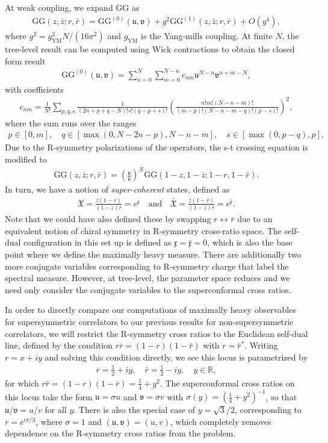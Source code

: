 \documentclass[a4paper,11pt]{article}
\theoremstyle{plain}
\theoremstyle{definition}
\theoremstyle{remark}
\newcommand{\ba}{\begin{equation} \begin{aligned}}
\newcommand{\ea}{\end{aligned} \end{equation}}
\begin{document}
At weak coupling, we expand $\mathrm{GG}$ as
\ba
\mathrm{GG}(z,\bar{z};r,\bar{r}) = \mathrm{GG}^{(0)}(\mathfrak{u},\mathfrak{v}) + g^2 \mathrm{GG}^{(1)}(z,\bar{z};r,\bar{r})  + O(g^4),
\ea
where $g^2 = g_{\mathrm{YM}}^2 N /(16 \pi^2)$ and $g_{\mathrm{YM}}$ is the Yang-mills coupling. At finite $N$, the tree-level result can be computed using Wick contractions to obtain the closed form result~\cite{Vescovi:2021fjf}
\ba
\mathrm{GG}^{(0)}(\mathfrak{u},\mathfrak{v}) = \sum_{n=0}^N \sum_{m=0}^{N-n} c_{nm} \mathfrak{u}^{N-n}\mathfrak{v}^{n+m-N},
\ea
with coefficients
\ba
c_{nm}  = \frac{1}{N!} \sum_{p,q,s} \frac{1}{(2n + p + q - N)!  s!  (q - p + s)!} \left(
\frac{n!  m!  (N - n - m)!}{(m - p)!  (N - n - m - q)!  (p - s)!} \right)^2,
\ea
where the sum runs over the ranges
\ba
p \in [0, m], \quad 
q \in [\max(0, N - 2n - p),  N - n - m], \quad 
s \in [\max(0, p - q),  p].
\ea
Due to the R-symmetry polarizations of the operators, the s-t crossing equation is modified to
\ba
\mathrm{GG}(z, \bar{z};r,\bar{r}) = \left( \frac{\mathfrak{u}}{\mathfrak{v}}\right)^N \mathrm{GG}(1-z,1- \bar{z};1-r,1-\bar{r}).
\ea
In turn, we have a notion of \textit{super-coherent} states, defined as 
\ba
\mathfrak{X} = \frac{z (1-r)}{(1-z)r} = e^{\mathfrak{x}} \quad\text{and}\quad \bar{\mathfrak{X}} = \frac{\bar{z} (1-\bar{r})}{(1-\bar{z})\bar{r}} = e^{\bar{\mathfrak{x}}}. 
\ea
Note that we could have also defined these by swapping $r \leftrightarrow \bar{r}$ due to an equivalent notion of chiral symmetry in R-symmetry cross-ratio space. The self-dual configuration in this set up is defined as $\mathfrak{x} = \bar{\mathfrak{x}} = 0$, which is also the base point where we define the maximally heavy measure. There are additionally two more conjugate variables corresponding to R-symmetry charge that label the spectral measure. However, at tree-level, the parameter space reduces and we need only consider the conjugate variables to the superconformal cross ratios.

In order to directly compare our computations of maximally heavy observables for supersymmetric correlators to our previous results for non-supersymmetric correlators, we will restrict the R-symmetry cross ratios to the Euclidean self-dual line, defined by the condition $r \bar{r} = (1-r)(1-\bar{r})$ with $r = \bar{r}^*$. Writing $r = x+ i y$ and solving this condition directly, we see this locus is parametrized by
\ba
r = \tfrac{1}{2} + i y, \quad \bar{r} = \tfrac{1}{2} - iy, \quad y \in\mathbb{R},
\ea
for which $r\bar{r} = (1-r)(1-\bar{r}) = \tfrac{1}{4} + y^2$. The superconformal cross ratios on this locus take the form $\mathfrak{u} = \sigma u$ and $\mathfrak{v} = \sigma v$ with $\sigma(y) = ({\tfrac{1}{4} + y^2})^{-1}$, so that $\mathfrak{u}/\mathfrak{v} = u/v$ for all $y$. There is also the special case of $y = \sqrt{3}/2$, corresponding to $r = e^{i\pi/3}$, where $\sigma = 1$ and $(\mathfrak{u},\mathfrak{v}) = (u,v)$, which completely removes dependence on the R-symmetry cross ratios from the problem.
\end{document}
